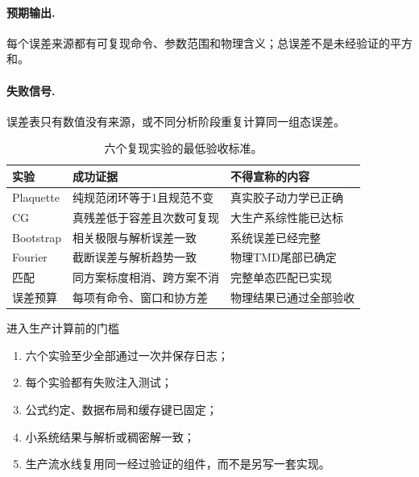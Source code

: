 \documentclass[UTF8,12pt,a4paper,twoside,openany]{ctexbook}
\begin{document}
\paragraph{预期输出.} 每个误差来源都有可复现命令、参数范围和物理含义；总误差不是未经验证的平方和。

\paragraph{失败信号.} 误差表只有数值没有来源，或不同分析阶段重复计算同一组态误差。

\begin{table}[htbp]
\centering
\caption{六个复现实验的最低验收标准。}
\label{tab:lab-acceptance}
\small
\begin{tabularx}{\textwidth}{L{2.2cm}L{4.4cm}Y}
\toprule
实验 & 成功证据 & 不得宣称的内容 \\
\midrule
Plaquette & 纯规范闭环等于1且规范不变 & 真实胶子动力学已正确 \\
CG & 真残差低于容差且次数可复现 & 大生产系综性能已达标 \\
Bootstrap & 相关极限与解析误差一致 & 系统误差已经完整 \\
Fourier & 截断误差与解析趋势一致 & 物理TMD尾部已确定 \\
匹配 & 同方案标度相消、跨方案不消 & 完整单态匹配已实现 \\
误差预算 & 每项有命令、窗口和协方差 & 物理结果已通过全部验收 \\
\bottomrule
\end{tabularx}
\end{table}

\begin{checkpointbox}{进入生产计算前的门槛}
\begin{enumerate}
  \item 六个实验至少全部通过一次并保存日志；
  \item 每个实验都有失败注入测试；
  \item 公式约定、数据布局和缓存键已固定；
  \item 小系统结果与解析或稠密解一致；
  \item 生产流水线复用同一经过验证的组件，而不是另写一套实现。
\end{enumerate}
\end{checkpointbox}
\end{document}
